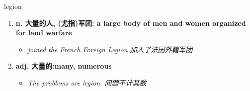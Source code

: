 
\begin{frame}
{\huge legion}
\begin{center}
\begin{enumerate}\Large
  \item \textbf{n. 大量的人, (尤指)军团: a large body of men and women organized for land warfare}
  \begin{itemize}
    \item \em{\Large{joined the French Foreign Legion 加入了法国外籍军团}}
  \end{itemize}
  \item \textbf{adj. 大量的:many, numerous}
  \begin{itemize}
    \item \em{\Large{The problems are legion. 问题不计其数}}
  \end{itemize}
\end{enumerate}
\end{center}
\end{frame}
